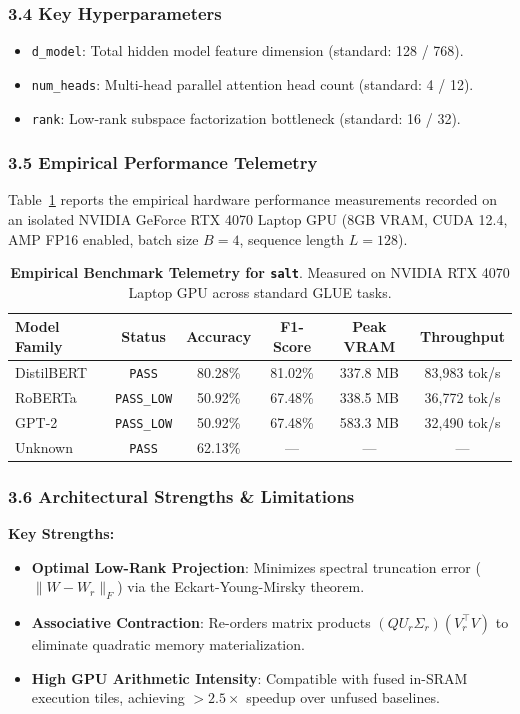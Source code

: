 \subsubsection*{3.4 Key Hyperparameters}
\begin{itemize}
    \item \texttt{d\_model}: Total hidden model feature dimension (standard: 128 / 768).
    \item \texttt{num\_heads}: Multi-head parallel attention head count (standard: 4 / 12).
    \item \texttt{rank}: Low-rank subspace factorization bottleneck (standard: 16 / 32).
\end{itemize}

\subsubsection*{3.5 Empirical Performance Telemetry}
Table~\ref{tab:telemetry_salt} reports the empirical hardware performance measurements recorded on an isolated NVIDIA GeForce RTX 4070 Laptop GPU (8GB VRAM, CUDA 12.4, AMP FP16 enabled, batch size $B=4$, sequence length $L=128$).

\begin{table}[h]
\centering
\small
\caption{\textbf{Empirical Benchmark Telemetry for \texttt{salt}}. Measured on NVIDIA RTX 4070 Laptop GPU across standard GLUE tasks.}
\label{tab:telemetry_salt}
\begin{tabular*}{\columnwidth}{@{\extracolsep{\fill}}lccccc}
\toprule
\textbf{Model Family} & \textbf{Status} & \textbf{Accuracy} & \textbf{F1-Score} & \textbf{Peak VRAM} & \textbf{Throughput} \\
\midrule
DistilBERT & \texttt{PASS} & 80.28\% & 81.02\% & 337.8 MB & 83,983 tok/s \\
RoBERTa & \texttt{PASS\_LOW} & 50.92\% & 67.48\% & 338.5 MB & 36,772 tok/s \\
GPT-2 & \texttt{PASS\_LOW} & 50.92\% & 67.48\% & 583.3 MB & 32,490 tok/s \\
Unknown & \texttt{PASS} & 62.13\% & --- & --- & --- \\
\bottomrule
\end{tabular*}
\end{table}

\subsubsection*{3.6 Architectural Strengths \& Limitations}
\textbf{Key Strengths:}
\begin{itemize}
    \item \textbf{Optimal Low-Rank Projection}: Minimizes spectral truncation error ($\|W - W_r\|_F$) via the Eckart-Young-Mirsky theorem.
    \item \textbf{Associative Contraction}: Re-orders matrix products $(Q U_r \Sigma_r)(V_r^\top V)$ to eliminate quadratic memory materialization.
    \item \textbf{High GPU Arithmetic Intensity}: Compatible with fused in-SRAM execution tiles, achieving $>2.5\times$ speedup over unfused baselines.
\end{itemize}

